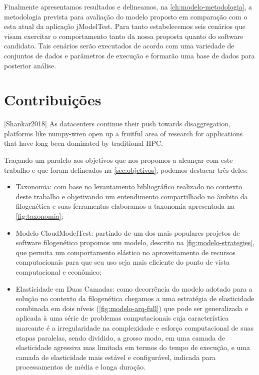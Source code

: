 \documentclass[english,brazilian]{UNISINOSmonografia} %
\begin{document}
Finalmente apresentamos resultados e delineamos, na \autoref{ch:modelo-metodologia}, a metodologia prevista para avaliação do modelo proposto em comparação com o esta atual da aplicação jModelTest.
Para tanto estabelecemos seis cenários que visam exercitar o comportamento tanto da nossa proposta quanto do software candidato.
Tais cenários serão executados de acordo com uma variedade de conjuntos de dados e parâmetros de execução e formarão uma base de dados para posterior análise.



\section{Contribuições}



[Shankar2018]
As datacenters continue
their push towards disaggregation, platforms like numpy-wren open up a fruitful area of research for applications
that have long been dominated by traditional HPC.



Traçando um paralelo aos objetivos que nos propomos a alcançar com este trabalho e que foram delineados na \autoref{sec:objetivos}, podemos destacar três deles:

\begin{itemize}
	\item Taxonomia: com base no levantamento bibliográfico realizado no contexto deste trabalho e objetivando um entendimento compartilhado no âmbito da filogenética e suas ferramentas elaboramos a taxonomia apresentada na \autoref{fig:taxonomia};
	
	\item Modelo CloudModelTest: partindo de um dos mais populares projetos de software filogenético propomos um modelo, descrito na \autoref{fig:modelo-strategies}, que permita um comportamento elástico no aproveitamento de recursos computacionais para que seu uso seja mais eficiente do ponto de vista computacional e econômico;
	
	\item Elasticidade em Duas Camadas: como decorrência do modelo adotado para a solução no contexto da filogenética chegamos a uma estratégia de elasticidade combinada em dois níveis (\autoref{fig:modelo-arq-full}) que pode ser generalizada e aplicada à uma série de problemas computacionais cuja característica marcante é a irregularidade na complexidade e esforço computacional de suas etapas paralelas, sendo dividido, a grosso modo, em uma camada de elasticidade agressiva mas limitada em termos do tempo de execução, e uma camada de elasticidade mais estável e configurável, indicada para processamentos de média e longa duração.
\end{itemize}
\end{document}

